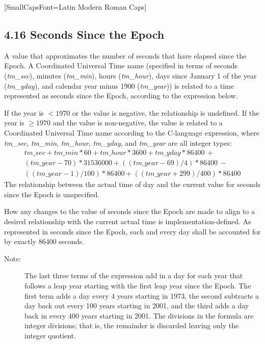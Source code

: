 \documentclass[letterpaper,twoside]{article}
\begin{document}
{\setmainfont{Old Standard}[SmallCapsFont={Latin Modern Roman Caps}]
  \rmfamily
  
  \subsection*{4.16 Seconds Since the Epoch}
  A value that approximates the number
  of seconds that have elapsed
  since the Epoch. A Coordinated Universal Time name
  (specified in terms of seconds ({\itshape tm\_sec}),
  minutes ({\itshape tm\_min}),
  hours ({\itshape tm\_hour}), days since January 1 of the year
  ({\itshape tm\_yday}),
  and calendar year minus 1900 ({\itshape tm\_year})) is related to a time
  represented as seconds since the Epoch, according to the expression below.

  If the year is $< 1970$ or the value is negative, the relationship is
  undefined.
  If the year is $\geq 1970$ and the value is non-negative, the value is
  related to a Coordinated Universal Time name according to the
  C-language expression, where {\itshape tm\_sec}, {\itshape tm\_min},
  {\itshape tm\_hour},
  {\itshape tm\_yday}, and {\itshape tm\_year} are all integer types:
  \begin{multline*}
    tm\_sec + tm\_min*60 + tm\_hour*3600 + tm\_yday*86400 \,+ \\
    (tm\_year-70)*31536000 + ((tm\_year-69)/4)*86400 \,- \\
    ((tm\_year-1)/100)*86400 + ((tm\_year+299)/400)*86400
  \end{multline*}
  The relationship between the actual time of day and the current value
  for seconds since the Epoch is unspecified.

  How any changes to the value of seconds since the Epoch are made
  to align to a desired relationship with the current actual time
  is implementation-defined. As represented in seconds since the Epoch,
  each and every day shall be accounted for by exactly \num{86400} seconds.
  
  \begin{description}
  \item[Note:]
    The last three terms of the expression add in a day for each year
    that follows a leap year starting with the first leap year since
    the Epoch. The first term adds a day every 4 years starting in 1973,
    the second subtracts a day back out every 100 years starting in 2001,
    and the third adds a day back in every 400 years starting in 2001.
    The divisions in the formula are integer divisions; that is, the
    remainder is discarded leaving only the integer quotient.
  \end{description}

}
\end{document}
